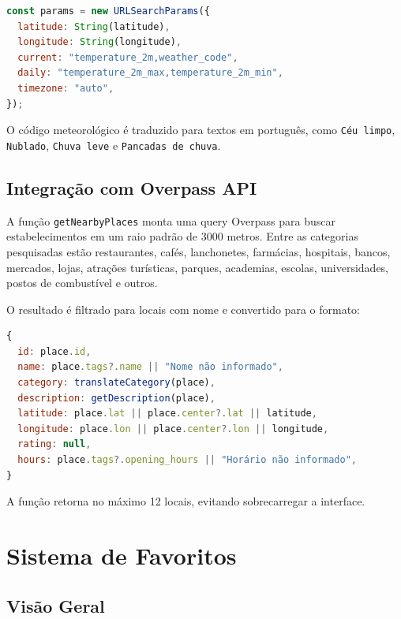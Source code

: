 \documentclass[
    12pt,
    oneside,
    openright,
    a4paper,
    english,
    brazil
]{abntex2}
\begin{document}
\begin{lstlisting}[language=JavaScript, caption={Parâmetros de clima}]
const params = new URLSearchParams({
  latitude: String(latitude),
  longitude: String(longitude),
  current: "temperature_2m,weather_code",
  daily: "temperature_2m_max,temperature_2m_min",
  timezone: "auto",
});
\end{lstlisting}

O código meteorológico é traduzido para textos em português, como \texttt{Céu limpo}, \texttt{Nublado}, \texttt{Chuva leve} e \texttt{Pancadas de chuva}.

\section{Integração com Overpass API}

A função \texttt{getNearbyPlaces} monta uma query Overpass para buscar estabelecimentos em um raio padrão de 3000 metros. Entre as categorias pesquisadas estão restaurantes, cafés, lanchonetes, farmácias, hospitais, bancos, mercados, lojas, atrações turísticas, parques, academias, escolas, universidades, postos de combustível e outros.

O resultado é filtrado para locais com nome e convertido para o formato:

\begin{lstlisting}[language=JavaScript, caption={Formato de local retornado ao frontend}]
{
  id: place.id,
  name: place.tags?.name || "Nome não informado",
  category: translateCategory(place),
  description: getDescription(place),
  latitude: place.lat || place.center?.lat || latitude,
  longitude: place.lon || place.center?.lon || longitude,
  rating: null,
  hours: place.tags?.opening_hours || "Horário não informado",
}
\end{lstlisting}

A função retorna no máximo 12 locais, evitando sobrecarregar a interface.


\chapter{Sistema de Favoritos}

\section{Visão Geral}
\end{document}
